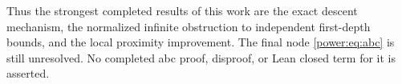 Thus the strongest completed results of this work are the exact descent
mechanism, the normalized infinite obstruction to independent first-depth
bounds, and the local proximity improvement. The final node
\eqref{power:eq:abc} is still unresolved. No completed abc proof, disproof, or
Lean closed term for it is asserted.



\endgroup
